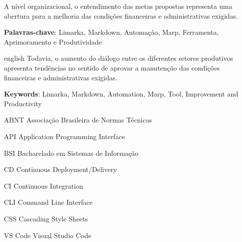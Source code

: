 \documentclass[
	12pt,				%
	oneside,			%
	a4paper,			%
	english,			%
	french,				%
	spanish,			%
	brazil				%
	]{abntex2}
\newcommand{\listasdousuario}{}
\begin{document}


\setlength{\absparsep}{18pt} %
\begin{resumo}

  A nível organizacional, o entendimento das metas propostas representa
  uma abertura para a melhoria das condições financeiras e administrativas
  exigidas.

 \textbf{Palavras-chave}: Limarka, Markdown, Automação, Marp, Ferramenta, Aprimoramento e
Produtividade
\end{resumo}



\begin{resumo}[Abstract]
 \begin{otherlanguage*}{english}
   Todavia, o aumento do diálogo entre os diferentes setores produtivos
   apresenta tendências no sentido de aprovar a manutenção das condições
   financeiras e administrativas exigidas.

   \vspace{\onelineskip}
 
   \noindent 
   \textbf{Keywords}: Limarka, Markdown, Automation, Marp, Tool, Improvement and Productivity
 \end{otherlanguage*}
\end{resumo}



\listoffigures*
\cleardoublepage



\listasdousuario

\begin{siglas}
  \item[ABNT] Associação Brasileira de Normas Técnicas
  \item[API] Application Programming Interface
  \item[BSI] Bacharelado em Sistemas de Informação
  \item[CD] Continuous Deployment/Delivery
  \item[CI] Continuous Integration
  \item[CLI] Command Line Interface
  \item[CSS] Cascading Style Sheets
  \item[VS Code] Visual Studio Code
\end{siglas}
\end{document}

